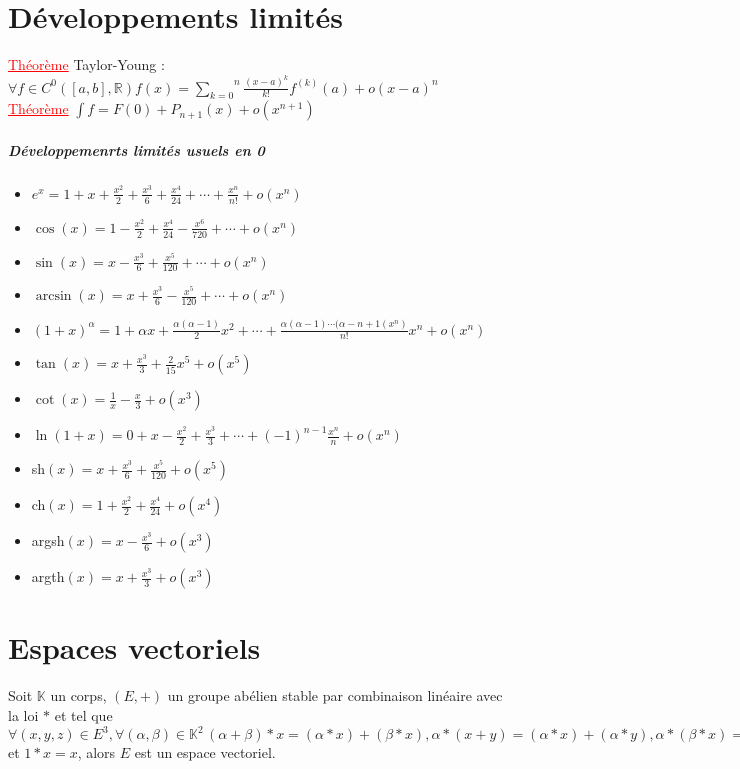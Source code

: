 \documentclass[a4paper, 11pt, french]{article}
\newcommand{\R}{\mathbb{R}}
\newcommand{\K}{\mathbb{K}}
\newcommand{\al}{\alpha}
\newcommand{\be}{\beta}
\newcommand{\som}[2]{\overset{#2}{\underset{#1}{\sum}}}
\newcommand{\thm}{\textcolor{red}{\underline{Théorème} }}
\newcommand{\inv}[1]{\frac{1}{#1}}
\begin{document}
	\section*{Développements limités}
	 \thm Taylor-Young : $\forall f \in C^0([a,b],\R) f(x)=\som{k=0}{n}\frac{(x-a)^k}{k!}f^{(k)}(a)+o(x-a)^n$ \\
	 \thm $\int f=F(0)+P_{n+1}(x)+o(x^{n+1})$
	\subparagraph*{Développemenrts limités usuels en 0}
	\begin{itemize}
	  \item $e^x=1+x+\frac{x^2}{2}+\frac{x^3}{6}+\frac{x^4}{24}+\cdots+\frac{x^n}{n!}+o(x^n)$
	  \item $\cos(x)=1-\frac{x^2}{2}+\frac{x^4}{24}-\frac{x^6}{720}+\cdots+o(x^n)$
	  \item $\sin(x)=x-\frac{x^3}{6}+\frac{x^5}{120}+\cdots+o(x^n)$
	  \item $\arcsin(x)=x+\frac{x^3}{6}-\frac{x^5}{120}+\cdots+o(x^n)$
	  \item $(1+x)^\al=1+\al x+\frac{\al(\al-1)}{2}x^2+\cdots+ \frac{\al(\al-1)\cdots(\al-n+1(x^n)}{n!}x^n+o(x^n)$
	  \item $\tan(x)=x+\frac{x^3}{3}+\frac{2}{15}x^5+o(x^5)$
	  \item $\cot(x)=\inv{x}-\frac{x}{3}+o(x^3)$
	  \item $\ln(1+x)=0+x-\frac{x^2}{2}+\frac{x^3}{3}+\cdots+(-1)^{n-1}\frac{x^{n}}{n}+o(x^n)$
	  \item sh$(x)=x+\frac{x^3}{6}+\frac{x^5}{120}+o(x^5)$
	  \item ch$(x)=1+\frac{x^2}{2}+\frac{x^4}{24}+o(x^4)$
	  \item argsh$(x)=x-\frac{x^3}{6}+o(x^3)$
	  \item argth$(x)=x+\frac{x^3}{3}+o(x^3)$
	\end{itemize}

	\section*{Espaces vectoriels}
	Soit $\K$ un corps, $(E,+)$ un groupe abélien stable par combinaison linéaire avec la loi $*$ et tel que $\forall (x,y,z)\in E^3,\forall (\al,\be) \in \K^2 \, (\al+\be)*x=(\al*x)+(\be*x), \al*(x+y)=(\al*x)+(\al*y), \al*(\be*x)=(\al  \be)*x$ et $1*x=x$, alors $E$ est un espace vectoriel.
\end{document}
